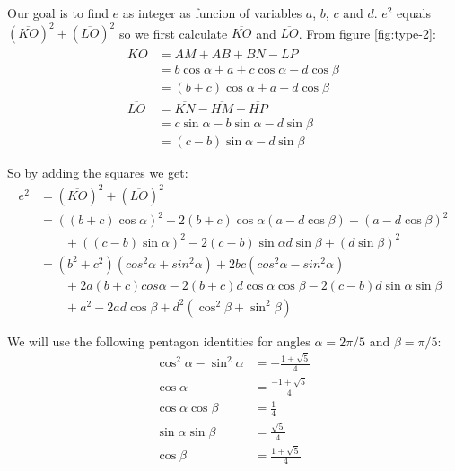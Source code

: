 \documentclass[11pt]{article}
\begin{document}
Our goal is to find $e$ as integer as funcion of variables $a$, $b$, $c$ and $d$.
$e^2$ equals $(\overline{KO})^2 + (\overline{LO})^2$ so we first calculate 
$\overline{KO}$ and $\overline{LO}$. From figure \ref{fig:type-2}:
\begin{align*}
\overline{KO} &= \overline{AM} + \overline{AB} + \overline{BN} - \overline{LP}\\
              &= b\cos{\alpha} + a + c\cos{\alpha} - d\cos{\beta}\\
              &= (b+c)\cos{\alpha} + a  - d\cos{\beta}\\
\overline{LO} &= \overline{KN} - \overline{HM} - \overline{HP}\\
              &= c\sin{\alpha} - b\sin{\alpha} - d\sin{\beta}\\
              &= (c-b)\sin{\alpha} - d\sin{\beta}
\end{align*}

So by adding the squares we get:
\begin{align*}
e^2 &= (\overline{KO})^2 + (\overline{LO})^2\\
    &= ((b+c)\cos{\alpha})^2 + 2(b+c)\cos{\alpha}(a - d\cos{\beta}) + (a - d\cos{\beta})^2\\
    &\qquad + ((c-b)\sin{\alpha})^2 - 2(c-b)\sin{\alpha}d\sin{\beta} + (d\sin{\beta})^2\\
    &= (b^2+c^2)(cos^2{\alpha}+sin^2{\alpha}) + 2bc(cos^2{\alpha}-sin^2{\alpha})\\
    &\qquad + 2a(b+c)cos{\alpha} - 2(b+c)d\cos{\alpha}\cos{\beta} - 2(c-b)d\sin{\alpha}\sin{\beta}\\
    &\qquad + a^2 - 2ad\cos{\beta} + d^2(\cos^2{\beta} + \sin^2{\beta})
\end{align*}

We will use the following pentagon identities for angles $\alpha = 2\pi/5$ and $\beta = \pi/5$:
\begin{align*}
\cos^2{\alpha} - \sin^2{\alpha} &= -\frac{1 + \sqrt{5}}{4}\\
                   \cos{\alpha} &= \frac{-1+\sqrt{5}}{4}\\
        \cos{\alpha}\cos{\beta} &= \frac{1}{4}\\
        \sin{\alpha}\sin{\beta} &= \frac{\sqrt{5}}{4}\\
                    \cos{\beta} &= \frac{1+\sqrt{5}}{4}
\end{align*}
\end{document}
